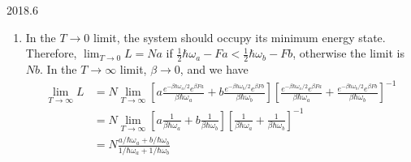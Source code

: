 \documentclass[12pt]{article}
\begin{document}
\begin{solution}{2018.6}
\begin{enumerate}
\item
In the $T \rightarrow 0$ limit, the system should occupy its minimum energy state.
Therefore, $\lim_{T \rightarrow 0} L = Na$ if 
$\frac{1}{2} \hbar \omega_a - Fa < \frac{1}{2} \hbar \omega_b - Fb$, otherwise the limit is $Nb$.
In the $T \rightarrow \infty$ limit, $\beta \rightarrow 0$, and we have
\begin{align*}
\lim_{T \rightarrow \infty} L & = N \lim_{T \rightarrow \infty} \left[
  a \frac{e^{-\beta \hbar \omega_a / 2} e^{\beta Fa}}{\beta \hbar \omega_a}
+ b \frac{e^{-\beta \hbar \omega_b / 2} e^{\beta Fb}}{\beta \hbar \omega_b} \right] 
\left[ \frac{e^{-\beta \hbar \omega_a / 2} e^{\beta Fa}}{\beta \hbar \omega_a}
+ \frac{e^{-\beta \hbar \omega_b / 2} e^{\beta Fb}}{\beta \hbar \omega_b} \right]^{-1} \\
& = N \lim_{T \rightarrow \infty} \left[
  a \frac{1}{\beta \hbar \omega_a}
+ b \frac{1}{\beta \hbar \omega_b} \right] 
\left[ \frac{1}{\beta \hbar \omega_a}
+ \frac{1}{\beta \hbar \omega_b} \right]^{-1} \\
& = N \frac{a/\hbar \omega_a + b/\hbar \omega_b}{1/\hbar \omega_a + 1/\hbar \omega_b}
\end{align*}


\end{enumerate}

\end{solution}
\end{document}
